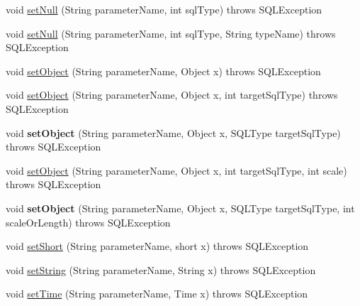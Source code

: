 \begin{DoxyCompactItemize}
\item 
void \mbox{\hyperlink{classcom_1_1mysql_1_1cj_1_1jdbc_1_1_callable_statement_a75fd7895affb02fdb0d77a4093554b89}{set\+Null}} (String parameter\+Name, int sql\+Type)  throws S\+Q\+L\+Exception 
\item 
void \mbox{\hyperlink{classcom_1_1mysql_1_1cj_1_1jdbc_1_1_callable_statement_a3358832780f6cdacf23551c4321bf35f}{set\+Null}} (String parameter\+Name, int sql\+Type, String type\+Name)  throws S\+Q\+L\+Exception 
\item 
void \mbox{\hyperlink{classcom_1_1mysql_1_1cj_1_1jdbc_1_1_callable_statement_a2a37988196c65bd7d26890a1fe33281b}{set\+Object}} (String parameter\+Name, Object x)  throws S\+Q\+L\+Exception 
\item 
void \mbox{\hyperlink{classcom_1_1mysql_1_1cj_1_1jdbc_1_1_callable_statement_a43a0be416f90c7c642fc33122bbccfb1}{set\+Object}} (String parameter\+Name, Object x, int target\+Sql\+Type)  throws S\+Q\+L\+Exception 
\item 
\mbox{\label{classcom_1_1mysql_1_1cj_1_1jdbc_1_1_callable_statement_a9236a7d2f476d95497910b71db906c07}} 
void {\bfseries set\+Object} (String parameter\+Name, Object x, S\+Q\+L\+Type target\+Sql\+Type)  throws S\+Q\+L\+Exception 
\item 
void \mbox{\hyperlink{classcom_1_1mysql_1_1cj_1_1jdbc_1_1_callable_statement_a5b8dc26448026aec39c4e87831d1e045}{set\+Object}} (String parameter\+Name, Object x, int target\+Sql\+Type, int scale)  throws S\+Q\+L\+Exception 
\item 
\mbox{\label{classcom_1_1mysql_1_1cj_1_1jdbc_1_1_callable_statement_a857ad3f2a98d42fb3fd2c19d5134f23f}} 
void {\bfseries set\+Object} (String parameter\+Name, Object x, S\+Q\+L\+Type target\+Sql\+Type, int scale\+Or\+Length)  throws S\+Q\+L\+Exception 
\item 
void \mbox{\hyperlink{classcom_1_1mysql_1_1cj_1_1jdbc_1_1_callable_statement_a3e077220a5f501fd6a1455055ac27aa5}{set\+Short}} (String parameter\+Name, short x)  throws S\+Q\+L\+Exception 
\item 
void \mbox{\hyperlink{classcom_1_1mysql_1_1cj_1_1jdbc_1_1_callable_statement_a31f6dfa1f9643a1b4ed3efd57d00bc2b}{set\+String}} (String parameter\+Name, String x)  throws S\+Q\+L\+Exception 
\item 
void \mbox{\hyperlink{classcom_1_1mysql_1_1cj_1_1jdbc_1_1_callable_statement_abaeaf443ba9998c9378de127b63c4eaa}{set\+Time}} (String parameter\+Name, Time x)  throws S\+Q\+L\+Exception 

\end{DoxyCompactItemize}
